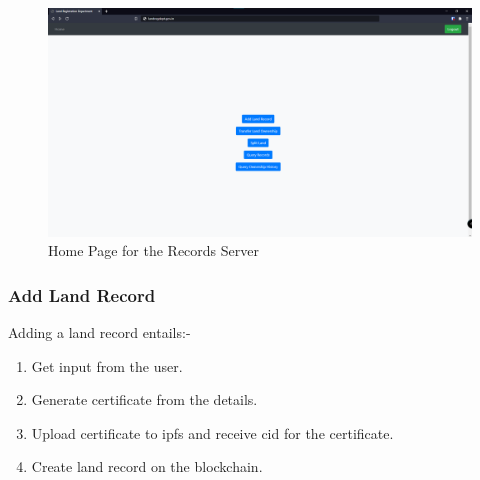 \documentclass[12pt]{article}
\begin{document}
        \begin{figure}[H]
            \includegraphics[scale=0.25]{records_home}
            \centering
            \caption{Home Page for the Records Server}
        \end{figure}
        
        

        \subsubsection{Add Land Record}
            Adding a land record entails:-
            \begin{enumerate}
                \item Get input from the user.
                \item Generate certificate from the details.
                \item Upload certificate to \acrshort{ipfs} and receive \acrshort{cid} for the certificate.
                \item Create land record on the blockchain.
            \end{enumerate}
\end{document}
